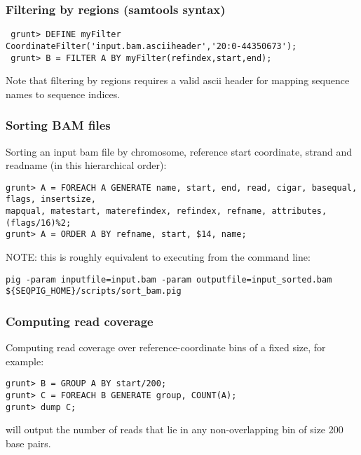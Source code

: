  \subsubsection{Filtering by regions (samtools syntax)}
\begin{lstlisting}
 grunt> DEFINE myFilter CoordinateFilter('input.bam.asciiheader','20:0-44350673');
 grunt> B = FILTER A BY myFilter(refindex,start,end);
\end{lstlisting}
Note that filtering by regions requires a valid ascii header for mapping
sequence names to sequence indices.

 \subsubsection{Sorting BAM files}
Sorting an input bam file by chromosome, reference start coordinate, strand
and readname (in this hierarchical order):
\begin{lstlisting}
grunt> A = FOREACH A GENERATE name, start, end, read, cigar, basequal, flags, insertsize,
mapqual, matestart, materefindex, refindex, refname, attributes, (flags/16)%2;
grunt> A = ORDER A BY refname, start, $14, name;
\end{lstlisting}
NOTE: this is roughly equivalent to executing from the command line:
\begin{lstlisting}
pig -param inputfile=input.bam -param outputfile=input_sorted.bam ${SEQPIG_HOME}/scripts/sort_bam.pig
\end{lstlisting}

 \subsubsection{Computing read coverage}
Computing read coverage over reference-coordinate bins of a fixed size,
for example:
\begin{lstlisting}
grunt> B = GROUP A BY start/200;
grunt> C = FOREACH B GENERATE group, COUNT(A);
grunt> dump C; 
\end{lstlisting}
will output the number of reads that lie in any non-overlapping bin of size 200 base pairs.

